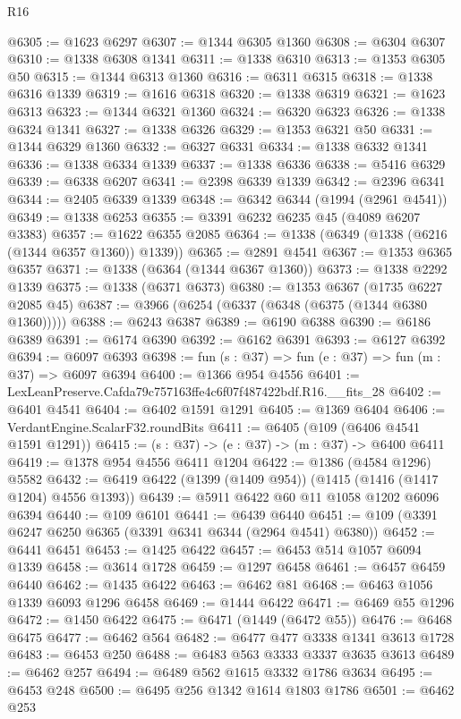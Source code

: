 \begin{lexlean}{R16}
\begin{coremodule}
@6305 := @1623 @6297
@6307 := @1344 @6305 @1360
@6308 := @6304 @6307
@6310 := @1338 @6308 @1341
@6311 := @1338 @6310
@6313 := @1353 @6305 @50
@6315 := @1344 @6313 @1360
@6316 := @6311 @6315
@6318 := @1338 @6316 @1339
@6319 := @1616 @6318
@6320 := @1338 @6319
@6321 := @1623 @6313
@6323 := @1344 @6321 @1360
@6324 := @6320 @6323
@6326 := @1338 @6324 @1341
@6327 := @1338 @6326
@6329 := @1353 @6321 @50
@6331 := @1344 @6329 @1360
@6332 := @6327 @6331
@6334 := @1338 @6332 @1341
@6336 := @1338 @6334 @1339
@6337 := @1338 @6336
@6338 := @5416 @6329
@6339 := @6338 @6207
@6341 := @2398 @6339 @1339
@6342 := @2396 @6341
@6344 := @2405 @6339 @1339
@6348 := @6342 @6344 (@1994 (@2961 @4541))
@6349 := @1338 @6253
@6355 := @3391 @6232 @6235 @45 (@4089 @6207 @3383)
@6357 := @1622 @6355 @2085
@6364 := @1338 (@6349 (@1338 (@6216 (@1344 @6357 @1360)) @1339))
@6365 := @2891 @4541
@6367 := @1353 @6365 @6357
@6371 := @1338 (@6364 (@1344 @6367 @1360))
@6373 := @1338 @2292 @1339
@6375 := @1338 (@6371 @6373)
@6380 := @1353 @6367 (@1735 @6227 @2085 @45)
@6387 := @3966 (@6254 (@6337 (@6348 (@6375 (@1344 @6380 @1360)))))
@6388 := @6243 @6387
@6389 := @6190 @6388
@6390 := @6186 @6389
@6391 := @6174 @6390
@6392 := @6162 @6391
@6393 := @6127 @6392
@6394 := @6097 @6393
@6398 := fun (s : @37) => fun (e : @37) => fun (m : @37) => @6097 @6394
@6400 := @1366 @954 @4556
@6401 := LexLeanPreserve.Cafda79c757163ffe4c6f07f487422bdf.R16.__fits_28
@6402 := @6401 @4541
@6404 := @6402 @1591 @1291
@6405 := @1369 @6404
@6406 := VerdantEngine.ScalarF32.roundBits
@6411 := @6405 (@109 (@6406 @4541 @1591 @1291))
@6415 := (s : @37) -> (e : @37) -> (m : @37) -> @6400 @6411
@6419 := @1378 @954 @4556 @6411 @1204
@6422 := @1386 (@4584 @1296) @5582
@6432 := @6419 @6422 (@1399 (@1409 @954)) (@1415 (@1416 (@1417 @1204) @4556 @1393))
@6439 := @5911 @6422 @60 @11 @1058 @1202 @6096 @6394
@6440 := @109 @6101
@6441 := @6439 @6440
@6451 := @109 (@3391 @6247 @6250 @6365 (@3391 @6341 @6344 (@2964 @4541) @6380))
@6452 := @6441 @6451
@6453 := @1425 @6422
@6457 := @6453 @514 @1057 @6094 @1339
@6458 := @3614 @1728
@6459 := @1297 @6458
@6461 := @6457 @6459 @6440
@6462 := @1435 @6422
@6463 := @6462 @81
@6468 := @6463 @1056 @1339 @6093 @1296 @6458
@6469 := @1444 @6422
@6471 := @6469 @55 @1296
@6472 := @1450 @6422
@6475 := @6471 (@1449 (@6472 @55))
@6476 := @6468 @6475
@6477 := @6462 @564
@6482 := @6477 @477 @3338 @1341 @3613 @1728
@6483 := @6453 @250
@6488 := @6483 @563 @3333 @3337 @3635 @3613
@6489 := @6462 @257
@6494 := @6489 @562 @1615 @3332 @1786 @3634
@6495 := @6453 @248
@6500 := @6495 @256 @1342 @1614 @1803 @1786
@6501 := @6462 @253

\end{coremodule}
\end{lexlean}
